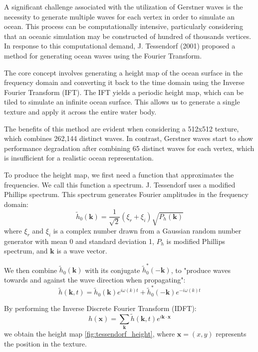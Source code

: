 \vspace{0.3cm}
A significant challenge associated with the utilization of Gerstner waves is the necessity to generate multiple waves for each vertex in order to simulate an ocean. This process can be computationally intensive, particularly considering that an oceanic simulation may be constructed of hundred of thousands vertices. In response to this computational demand, J. Tessendorf (2001) \cite{tessendorf2001} proposed a method for generating ocean waves using the Fourier Transform.

The core concept involves generating a height map of the ocean surface in the frequency domain and converting it back to the time domain using the Inverse Fourier Transform (IFT). The IFT yields a periodic height map, which can be tiled to simulate an infinite ocean surface. This allows us to generate a single texture and apply it across the entire water body.

The benefits of this method are evident when considering a 512x512 texture, which combines 262,144 distinct waves. In contrast, Gerstner waves start to show performance degradation after combining 65 distinct waves for each vertex, which is insufficient for a realistic ocean representation.

To produce the height map, we first need a function that approximates the frequencies. We call this function a spectrum. J. Tessendorf uses a modified Phillips spectrum. This spectrum generates Fourier amplitudes in the frequency domain:
\begin{equation}
    \tilde{h}_0(\mathbf{k}) = \frac{1}{\sqrt{2}}(\xi_r + \xi_i)\sqrt{P_h(\mathbf{k})}
    \label{eq:fouier_amplitudes}
\end{equation}
where $\xi_r$ and $\xi_i$ is a complex number drawn from a Gaussian random number generator with mean 0 and standard deviation 1, $P_h$ is modified Phillips spectrum, and $\mathbf{k}$ is a wave vector.

We then combine $\tilde{h}_0(\mathbf{k})$ with its conjugate $\tilde{h}^{*}_0(-\mathbf{k})$, to "produce waves towards and against the wave direction when propagating"\cite{horvath2015}:
\begin{equation}
    \tilde{h}(\mathbf{k}, t) = \tilde{h}_0(\mathbf{k})e^{i\omega(k)t}+\tilde{h}^{*}_0(-\mathbf{k})e^{-i\omega(k)t}
    \label{eq:combined_amplitudes}
\end{equation}

By performing the Inverse Discrete Fourier Transform (IDFT):
\begin{equation}
    h(\mathbf{x}) = \sum_{\mathbf{k}} \tilde{h}(\mathbf{k}, t)e^{i\mathbf{k}\cdot\mathbf{x}}
    \label{eq:height_map}
\end{equation}
we obtain the height map \ref{fig:tessendorf_height}, where $\mathbf{x}=(x,y)$ represents the position in the texture.

